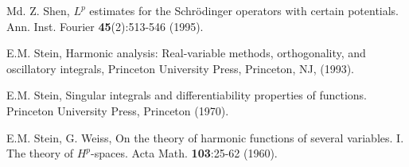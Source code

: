 \documentclass[11pt, reqno]{amsproc}
\theoremstyle{definition}
\theoremstyle{remark}
\numberwithin{equation}{section}
\begin{document}
\begin{thebibliography}{Md.}
 Z. Shen,  $L^p$ estimates for the Schr\"odinger operators with certain potentials.  Ann. Inst. Fourier \textbf{45}(2):513-546 (1995).

  E.M. Stein, Harmonic analysis: Real-variable methods, orthogonality, and oscillatory integrals, Princeton University Press, Princeton, NJ,
 (1993). 

E.M. Stein, Singular integrals and differentiability properties of functions. Princeton University Press, Princeton (1970).
 
 E.M. Stein, G. Weiss, On the theory of harmonic functions of several variables. I. The theory of $H^p$-spaces. Acta Math. \textbf{103}:25-62 (1960).

\end{thebibliography}
\end{document}
